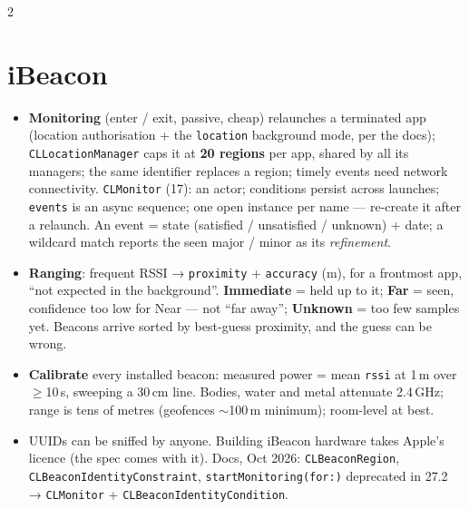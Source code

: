 \documentclass[8pt]{extarticle}
\newcommand\ct[1]{\texttt{#1}}
\begin{document}
\begin{multicols}{2}
\section{iBeacon}
\begin{itemize}
  \item \textbf{Monitoring} (enter / exit, passive, cheap) relaunches a terminated app (location
        authorisation + the \ct{location} background mode, per the docs);
        \ct{CLLocationManager} caps it at \textbf{20 regions} per app, shared by all its managers; the
        same identifier replaces a region; timely events need network connectivity. \ct{CLMonitor} (17): an actor;
        conditions persist across launches; \ct{events} is an async sequence; one open instance per
        name — re-create it after a relaunch. An event = state (satisfied / unsatisfied / unknown)
        + date; a wildcard match reports the seen major / minor as its \emph{refinement}.
  \item \textbf{Ranging}: frequent RSSI → \ct{proximity} + \ct{accuracy} (m), for a frontmost app,
        ``not expected in the background''. \textbf{Immediate} = held up to it; \textbf{Far} = seen,
        confidence too low for Near — not ``far away''; \textbf{Unknown} = too few samples yet.
        Beacons arrive sorted by best-guess proximity, and the guess can be wrong.
  \item \textbf{Calibrate} every installed beacon: measured power = mean \ct{rssi} at 1\,m over
        $\ge$10\,s, sweeping a 30\,cm line. Bodies, water and metal attenuate 2.4\,GHz; range is tens
        of metres (geofences $\sim$100\,m minimum); room-level at best.
  \item UUIDs can be sniffed by anyone. Building iBeacon hardware takes Apple's licence (the spec
        comes with it). Docs, Oct 2026: \ct{CLBeaconRegion}, \ct{CLBeaconIdentityConstraint},
        \ct{startMonitoring(for:)} deprecated in 27.2 → \ct{CLMonitor} + \ct{CLBeaconIdentityCondition}.
\end{itemize}


\end{multicols}
\end{document}
